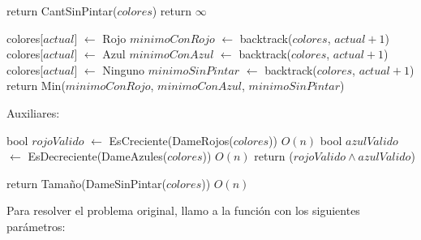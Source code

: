 \begin{algorithm}
\begin{algorithmic}


    \State return CantSinPintar($colores$)
  \Else
    \State return $\infty$
  \EndIf

\Else

  \State colores[$actual$] $\gets$ Rojo
  \State $minimoConRojo$ $\gets$ backtrack($colores$, $actual + 1$) \\

  \State colores[$actual$] $\gets$ Azul
  \State $minimoConAzul$ $\gets$ backtrack($colores$, $actual + 1$) \\

  \State colores[$actual$] $\gets$ Ninguno
  \State $minimoSinPintar$ $\gets$ backtrack($colores$, $actual + 1$) \\

  \State return Min($minimoConRojo$, $minimoConAzul$, $minimoSinPintar$)

\EndIf
\EndProcedure
\end{algorithmic}
\end{algorithm}


Auxiliares:

\begin{algorithm}
\begin{algorithmic}

    \State bool $rojoValido$ $\gets$ EsCreciente(DameRojos($colores$))  \Comment $O(n)$
    \State bool $azulValido$ $\gets$ EsDecreciente(DameAzules($colores$)) \Comment $O(n)$
    \State return ($rojoValido \land azulValido$)

\EndProcedure
\end{algorithmic}
\end{algorithm}


\begin{algorithm}
\begin{algorithmic}
    \State return Tamaño(DameSinPintar($colores$))  \Comment $O(n)$
\EndProcedure
\end{algorithmic}
\end{algorithm}


Para resolver el problema original, llamo a la función con los siguientes parámetros:

